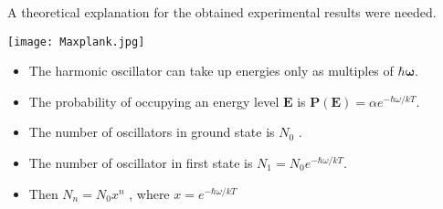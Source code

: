 \documentclass[aspectratio=169]{beamer}
\begin{document}
\begin{frame}{}

	\begin{multicols}{2}
	
\begin{center}
 \null \vfill
 {\large A theoretical explanation for the obtained experimental results were needed. }
 \vfill \null
\end{center}
 
	\columnbreak

		\begin{center}	
	
	 		\texttt{[image: Maxplank.jpg]}
	 
		\end{center}
	
	\end{multicols}
				
\end{frame}

\begin{frame}{}

	\begin{itemize}

		\item The harmonic oscillator can take up energies only as multiples of $ \mathbf{\hbar \omega} $. \pause  \newline
		\item The probability of occupying an energy level $ \mathbf{E} $ is {\large $\mathbf{P(E)} = \alpha e^{-\hbar \omega / kT}$}.  
	\end{itemize}
	
\end{frame}

\begin{frame}

	\begin{itemize}
	
		\item The number of oscillators in ground state is $ N_0 $ . \pause \newline
		\item The number of oscillator in first state is $ N_1 = N_0  e^{-\hbar \omega / kT} $.  \vspace{0.5cm} \pause
		\item Then $ N_n = N_0 x^n $ , where $ x = e^{-\hbar \omega / kT} $
	
	\end{itemize}
	
\end{frame}
\end{document}
